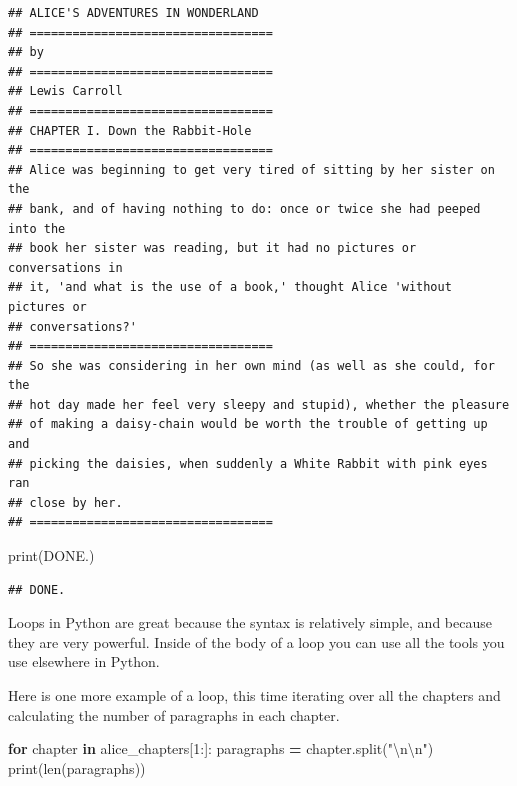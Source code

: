 \documentclass[
]{book}
\newenvironment{Shaded}{\begin{snugshade}}{\end{snugshade}}
\newcommand{\BuiltInTok}[1]{#1}
\newcommand{\CharTok}[1]{\textcolor[rgb]{0.31,0.60,0.02}{#1}}
\newcommand{\ControlFlowTok}[1]{\textcolor[rgb]{0.13,0.29,0.53}{\textbf{#1}}}
\newcommand{\DecValTok}[1]{\textcolor[rgb]{0.00,0.00,0.81}{#1}}
\newcommand{\KeywordTok}[1]{\textcolor[rgb]{0.13,0.29,0.53}{\textbf{#1}}}
\newcommand{\NormalTok}[1]{#1}
\newcommand{\OperatorTok}[1]{\textcolor[rgb]{0.81,0.36,0.00}{\textbf{#1}}}
\newcommand{\StringTok}[1]{\textcolor[rgb]{0.31,0.60,0.02}{#1}}
\begin{document}
\begin{verbatim}
## ﻿ALICE'S ADVENTURES IN WONDERLAND
## ==================================
## by
## ==================================
## Lewis Carroll
## ==================================
## CHAPTER I. Down the Rabbit-Hole
## ==================================
## Alice was beginning to get very tired of sitting by her sister on the
## bank, and of having nothing to do: once or twice she had peeped into the
## book her sister was reading, but it had no pictures or conversations in
## it, 'and what is the use of a book,' thought Alice 'without pictures or
## conversations?'
## ==================================
## So she was considering in her own mind (as well as she could, for the
## hot day made her feel very sleepy and stupid), whether the pleasure
## of making a daisy-chain would be worth the trouble of getting up and
## picking the daisies, when suddenly a White Rabbit with pink eyes ran
## close by her.
## ==================================
\end{verbatim}

\begin{Shaded}
\begin{Highlighting}[]
\BuiltInTok{print}\NormalTok{(}\StringTok{\textquotesingle{}DONE.\textquotesingle{}}\NormalTok{)}
\end{Highlighting}
\end{Shaded}

\begin{verbatim}
## DONE.
\end{verbatim}

Loops in Python are great because the syntax is relatively simple, and because they are very powerful. Inside of the body of a loop you can use all the tools you use elsewhere in Python.

Here is one more example of a loop, this time iterating over all the chapters and calculating the number of paragraphs in each chapter.

\begin{Shaded}
\begin{Highlighting}[]
\ControlFlowTok{for}\NormalTok{ chapter }\KeywordTok{in}\NormalTok{ alice\_chapters[}\DecValTok{1}\NormalTok{:]:}
\NormalTok{    paragraphs }\OperatorTok{=}\NormalTok{ chapter.split(}\StringTok{"}\CharTok{\textbackslash{}n\textbackslash{}n}\StringTok{"}\NormalTok{)}
    \BuiltInTok{print}\NormalTok{(}\BuiltInTok{len}\NormalTok{(paragraphs))}
\end{Highlighting}
\end{Shaded}
\end{document}
